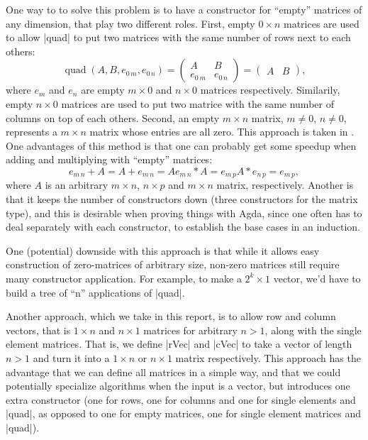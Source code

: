 One way to to solve this problem is to have a constructor for ``empty'' matrices of any dimension, that play two different roles. First, empty $0 \times n$ matrices are used to allow |quad| to put two matrices with the same number of rows next to each others:
\begin{equation}
\operatorname{quad}(A, B, e_{0\,m}, e_{0\,n}) =
\begin{pmatrix}
  A & B \\
  e_{0\,m} & e_{0\,n}
\end{pmatrix} = 
\begin{pmatrix}
  A & B
\end{pmatrix},
\end{equation}
where $e_m$ and $e_n$ are empty $m \times 0$ and $n\times 0$ matrices respectively. Similarily, empty $n \times 0$ matrices are used to put two matrice with the same number of columns on top of each others. Second, an empty $m \times n$ matrix, $m \ne 0$, $n \ne 0$, represents a $m \times n$ matrix whose entries are all zero. This approach is taken in \cite{JP-PP}. One advantages of this method is that one can probably get some speedup when adding and multiplying with ``empty'' matrices:
\begin{equation*}
  e_{m\, n} + A = A + e_{m\,n} = A
  e_{m\, n} * A = e_{m\,p}
  A * e_{n\,p}  = e_{m\,p},
\end{equation*}
where $A$ is an arbitrary $m \times n$, $n \times p$ and $m \times n$ matrix, respectively.
Another is that it keeps the number of constructors down (three constructors for the matrix type), and this is desirable when proving things with Agda, since one often has to deal separately with each constructor, to establish the base cases in an induction.

One (potential) downside with this approach is that while it allows easy construction of zero-matrices of arbitrary size, non-zero matrices still require many constructor application. For example, to make a $2^k \times 1$ vector, we'd have to build a tree of ``n''  applications of |quad|.

Another approach, which we take in this report, is to allow row and column vectors, that is $1 \times n$ and $n \times 1$ matrices for arbitrary $n > 1$, along with the single element matrices. That is, we define |rVec| and |cVec| to take a vector of length $n > 1$ and turn it into a $1 \times n$ or $n \times 1$ matrix respectively.
This approach has the advantage that we can define all matrices in a simple way, and that we could potentially specialize algorithms when the input is a vector, but introduces one extra constructor (one for rows, one for columns and one for single elements and |quad|, as opposed to one for empty matrices, one for single element matrices and |quad|).

